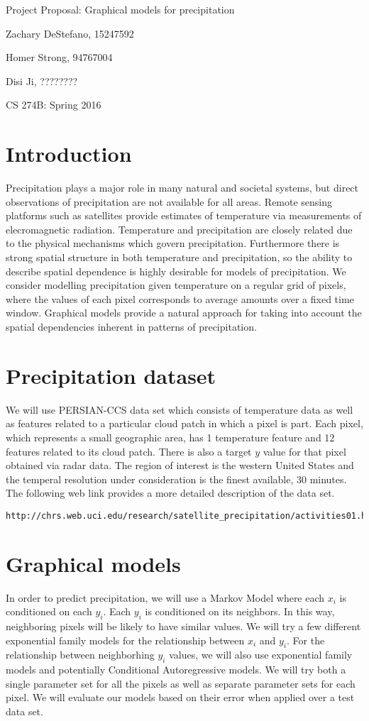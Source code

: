 \documentclass[twoside,11pt]{article}
\theoremstyle{definition}
\begin{document}
\centerline{\Large Project Proposal: Graphical models for precipitation}
\centerline{Zachary DeStefano, 15247592}
\centerline{Homer Strong, 94767004}
\centerline{Disi Ji, ????????}
\centerline{CS 274B: Spring 2016}

\section*{Introduction}
Precipitation plays a major role in many natural and societal systems, but direct observations of precipitation are not available for all areas. Remote sensing platforms such as satellites provide estimates of temperature via measurements of elecromagnetic radiation. Temperature and precipitation are closely related due to the physical mechanisms which govern precipitation. Furthermore there is strong spatial structure in both temperature and precipitation, so the ability to describe spatial dependence is highly desirable for models of precipitation. We consider modelling precipitation given temperature on a regular grid of pixels, where the values of each pixel corresponds to average amounts over a fixed time window. Graphical models provide a natural approach for taking into account the spatial dependencies inherent in patterns of precipitation.

\section*{Precipitation dataset}
We will use PERSIAN-CCS data set which consists of temperature data as well as features related to a particular cloud patch in which a pixel is part. Each pixel, which represents a small geographic area, has 1 temperature feature and 12 features related to its cloud patch. There is also a target $y$ value for that pixel obtained via radar data. The region of interest is the western United States and the temperal resolution under consideration is the finest available, 30 minutes. The following web link provides a more detailed description of the data set. 

\begin{lstlisting}
http://chrs.web.uci.edu/research/satellite_precipitation/activities01.html
\end{lstlisting}

\section*{Graphical models}
In order to predict precipitation, we will use a Markov Model where each $x_i$ is conditioned on each $y_i$. Each $y_i$ is conditioned on its neighbors. In this way, neighboring pixels will be likely to have similar values. We will try a few different exponential family models for the relationship between $x_i$ and $y_i$. For the relationship between neighborhing $y_i$ values, we will also use exponential family models and potentially Conditional Autoregressive models. We will try both a single parameter set for all the pixels as well as separate parameter sets for each pixel. We will evaluate our models based on their error when applied over a test data set. 
\end{document}
